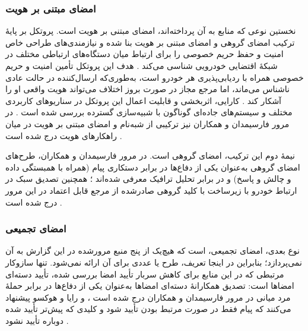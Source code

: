 \subsubsection{امضای مبتنی بر هویت}

نخستین نوعی که منابع به آن پرداخته‌اند، امضای مبتنی بر هویت است. پروتکل  بر پایهٔ ترکیب امضای گروهی و امضای مبتنی بر هویت بنا شده و نیازمندی‌های طراحی خاص امنیت و حفظ حریم خصوصی را برای ارتباط میان دستگاه‌های ارتباطی مختلف در شبکهٔ اقتضایی خودرویی شناسی می‌کند \cite{linGSISSecurePrivacyPreserving2007}. هدف این پروتکل تأمین امنیت و حریم خصوصی همراه با ردیابی‌پذیری هر خودرو است، به‌طوری‌که ارسال‌کننده در حالت عادی ناشناس می‌ماند، اما مرجع مجاز در صورت بروز اختلاف می‌تواند هویت واقعی او را آشکار کند \cite{linGSISSecurePrivacyPreserving2007}. کارایی، اثربخشی و قابلیت اعمال این پروتکل در سناریوهای کاربردی مختلف و سیستم‌های جاده‌ای گوناگون با شبیه‌سازی گسترده بررسی شده است \cite{linGSISSecurePrivacyPreserving2007}. در مرور فارسیمدان و همکاران نیز ترکیبی از شبه‌نام و امضای مبتنی بر هویت در میان راهکارهای هویت درج شده است \cite{farsimadanReviewSecurityChallenges2025}.

نیمهٔ دوم این ترکیب، امضای گروهی است. در مرور فارسیمدان و همکاران، طرح‌های امضای گروهی به‌عنوان یکی از دفاع‌ها در برابر دستکاری پیام (همراه با همبستگی داده و چالش و پاسخ) و در برابر تحلیل ترافیک معرفی شده‌اند \cite{farsimadanReviewSecurityChallenges2025}؛ همچنین تصدیق سبک در ارتباط خودرو با زیرساخت با کلید گروهی صادرشده از مرجع قابل اعتماد در این مرور درج شده است \cite{farsimadanReviewSecurityChallenges2025}.

\subsubsection{امضای تجمیعی}

نوع بعدی، امضای تجمیعی، است که هیچ‌یک از پنج منبع مرورشده در این گزارش به آن نمی‌پردازد؛ بنابراین در اینجا تعریف، طرح یا عددی برای آن ارائه نمی‌شود. تنها سازوکار مرتبطی که در این منابع برای کاهش سربار تأیید امضا بررسی شده، تأیید دسته‌ای امضاها است: تصدیق همکارانهٔ دسته‌ای امضاها به‌عنوان یکی از دفاع‌ها در برابر حملهٔ مرد میانی در مرور فارسیمدان و همکاران درج شده است \cite{farsimadanReviewSecurityChallenges2025}، و رایا و هوکسو پیشنهاد می‌کنند که پیام فقط در صورت مرتبط بودن تأیید شود و کلیدی که پیش‌تر تأیید شده دوباره تأیید نشود \cite{SecuringVehicularAd}.

